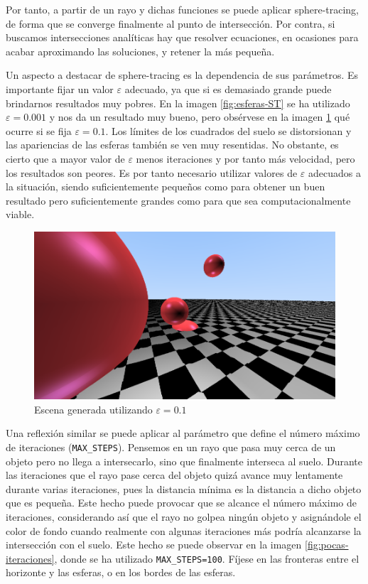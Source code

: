 Por tanto, a partir de un rayo y dichas funciones se puede aplicar sphere-tracing, de forma que se converge finalmente al punto de intersección. Por contra, si buscamos intersecciones analíticas hay que resolver ecuaciones, en ocasiones para acabar aproximando las soluciones, y retener la más pequeña. 

Un aspecto a destacar de sphere-tracing es la dependencia de sus parámetros. Es importante fijar un valor $\varepsilon$ adecuado, ya que si es demasiado grande puede brindarnos resultados muy pobres. En la imagen \ref{fig:esferas-ST} se ha utilizado $\varepsilon=0.001$ y nos da un resultado muy bueno, pero obsérvese en la imagen \ref{fig:epsilon-grande} qué ocurre si se fija $\varepsilon=0.1$. Los límites de los cuadrados del suelo se distorsionan y las apariencias de las esferas también se ven muy resentidas. No obstante, es cierto que a mayor valor de $\varepsilon$ menos iteraciones y por tanto más velocidad, pero los resultados son peores. Es por tanto necesario utilizar valores de $\varepsilon$ adecuados a la situación, siendo suficientemente pequeños como para obtener un buen resultado pero suficientemente grandes como para que sea computacionalmente viable.

\begin{figure} [ht]
    \centering
    \includegraphics[scale = 0.3]{img/C8/epsilon-grande.png}
    \caption{Escena generada utilizando $\varepsilon=0.1$}
    \label{fig:epsilon-grande}
\end{figure}

Una reflexión similar se puede aplicar al parámetro que define el número máximo de iteraciones (\verb|MAX_STEPS|). Pensemos en un rayo que pasa muy cerca de un objeto pero no llega a intersecarlo, sino que finalmente interseca al suelo. Durante las iteraciones que el rayo pase cerca del objeto quizá avance muy lentamente durante varias iteraciones, pues la distancia mínima es la distancia a dicho objeto que es pequeña. Este hecho puede provocar que se alcance el número máximo de iteraciones, considerando así que el rayo no golpea ningún objeto y asignándole el color de fondo cuando realmente con algunas iteraciones más podría alcanzarse la intersección con el suelo. Este hecho se puede observar en la imagen \ref{fig:pocas-iteraciones}, donde se ha utilizado \verb|MAX_STEPS=100|. Fíjese en las fronteras entre el horizonte y las esferas, o en los bordes de las esferas.


